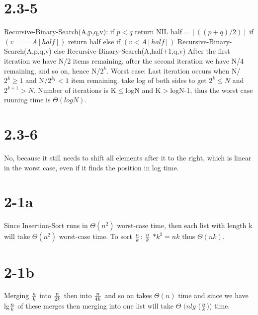 \documentclass[12pt]{article}
\newcommand\tab[1][1cm]{\hspace*{#1}}
\begin{document}
\section{2.3-5}
Recursive-Binary-Search(A,p,q,v): \tab if $p<q$ \tab \tab return NIL \tab half$=\left \lfloor ((p+q)/2) \right \rfloor$ \tab if $(v==A[half])$ \tab \tab return half \tab else if $(v<A[half])$ \tab \tab Recursive-Binary-Search(A,p,q,v) \tab else \tab \tab Recursive-Binary-Search(A,half$+$1,q,v) \newline \newline
After the first iteration we have N/2 items remaining, after the second iteration we have N/4 remaining, and so on, hence N/$2^k$. Worst case: Last iteration occurs when N/$2^k\geq1$ and N/$2^{k_1}<1$ item remaining. take log of both sides to get $2^k\leq N$ and $2^{k+1}>N$. Number of iterations is K$\leq$logN and K$>$logN-1, thus the worst case running time is $\Theta(logN)$.

\section{2.3-6}
No, because it still needs to shift all elements after it to the right, which is linear in the worst case, even if it finds the position in log time.

\section{2-1a}
Since Insertion-Sort runs in $\Theta(n^2)$ worst-case time, then each list with length k will take $\Theta(n^2)$ worst-case time. To sort $n\over k$: $n\over k $ $ \ast k^2 = nk$ thus $\Theta(nk)$.

\section{2-1b}
Merging $n\over k$ into $n\over 2k$ then into $n\over 4k$ and so on takes $\Theta(n)$ time and since we have lg$n \over k$ of these merges then merging into one list will take $\Theta$ $(nlg$ ($n\over k$)) time.
\end{document}
